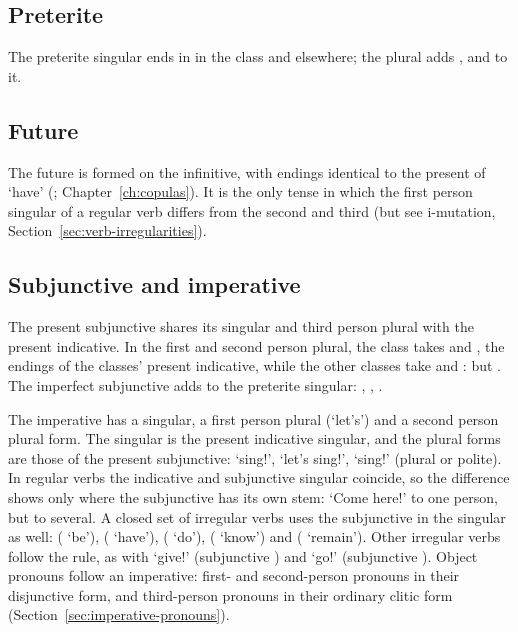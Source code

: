 \subsection{Preterite}
The preterite singular ends in  in the  class and  elsewhere; the plural adds ,  and  to it.

\subsection{Future}
The future is formed on the infinitive, with endings identical to the present of  `have' (; Chapter~\ref{ch:copulas}). It is the only tense in which the first person singular of a regular verb differs from the second and third (but see i-mutation, Section~\ref{sec:verb-irregularities}).

\subsection{Subjunctive and imperative}
The present subjunctive shares its singular and third person plural with the present indicative. In the first and second person plural, the  class takes  and , the endings of the  classes' present indicative, while the other classes take  and :  but . The imperfect subjunctive adds  to the preterite singular: , , .

The imperative has a singular, a first person plural (`let's') and a second person plural form. The singular is the present indicative singular, and the plural forms are those of the present subjunctive:  `sing!',  `let's sing!',  `sing!' (plural or polite). In regular verbs the indicative and subjunctive singular coincide, so the difference shows only where the subjunctive has its own stem:  `Come here!' to one person, but  to several. A closed set of irregular verbs uses the subjunctive in the singular as well:  ( `be'),  ( `have'),  ( `do'),  ( `know') and  ( `remain'). Other irregular verbs follow the rule, as with  `give!' (subjunctive ) and  `go!' (subjunctive ). Object pronouns follow an imperative: first- and second-person pronouns in their disjunctive form, and third-person pronouns in their ordinary clitic form (Section~\ref{sec:imperative-pronouns}).

